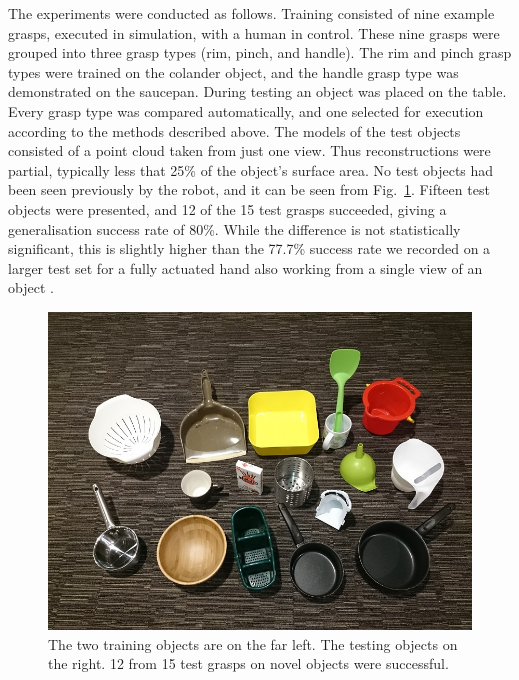 The experiments were conducted as follows. Training consisted of nine example grasps, executed in simulation, with a human in control. These nine grasps were grouped into three grasp types (rim, pinch, and handle). The rim and pinch grasp types were trained on the colander object, and the handle grasp type was demonstrated on the saucepan. During testing an object was placed on the table. Every grasp type was compared automatically, and one selected for execution according to the methods described above. The models of the test objects consisted of a point cloud taken from just one view. Thus reconstructions were partial, typically less that 25\% of the object's surface area. No test objects had been seen previously by the robot, and it can be seen from Fig.~\ref{fig:test}. Fifteen test objects were presented, and 12 of the 15 test grasps succeeded, giving a generalisation success rate of 80\%. While the difference is not statistically significant, this is slightly higher than the 77.7\% success rate we recorded on a larger test set for a fully actuated hand also working from a single view of an object \cite{kopicki-detry-wyatt-etal-ijrr-2015}.

\begin{figure}
\begin{center}
 \includegraphics[width=0.9\columnwidth]{images/object_set_small}
 \caption{The two training objects are on the far left. The testing objects on the right. 12 from 15 test grasps on novel objects were successful.}
 \label{fig:test}
 \end{center}
\end{figure}

